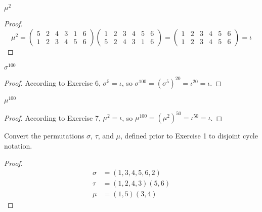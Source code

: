 \begin{exercise}
    $\mu^{2}$
\end{exercise}

\begin{proof}
    \[
        \mu^{2} =
        \begin{pmatrix}
            5 & 2 & 4 & 3 & 1 & 6 \\
            1 & 2 & 3 & 4 & 5 & 6
        \end{pmatrix}
        \begin{pmatrix}
            1 & 2 & 3 & 4 & 5 & 6 \\
            5 & 2 & 4 & 3 & 1 & 6
        \end{pmatrix} =
        \begin{pmatrix}
            1 & 2 & 3 & 4 & 5 & 6 \\
            1 & 2 & 3 & 4 & 5 & 6
        \end{pmatrix} =
        \iota
    \]
\end{proof}

\begin{exercise}
    $\sigma^{100}$
\end{exercise}

\begin{proof}
    According to Exercise 6, $\sigma^{5} = \iota$, so $\sigma^{100} = {(\sigma^{5})}^{20} = \iota^{20} = \iota$.
\end{proof}

\begin{exercise}
    $\mu^{100}$
\end{exercise}

\begin{proof}
    According to Exercise 7, $\mu^{2} = \iota$, so $\mu^{100} = {(\mu^{2})}^{50} = \iota^{50} = \iota$.
\end{proof}

\begin{exercise}
    Convert the permutations $\sigma$, $\tau$, and $\mu$, defined prior to Exercise 1 to disjoint cycle notation.
\end{exercise}

\begin{proof}
    \[
        \begin{split}
            \sigma & = (1, 3, 4, 5, 6, 2) \\
            \tau   & = (1, 2, 4, 3)(5, 6) \\
            \mu    & = (1, 5)(3, 4)
        \end{split}
    \]
\end{proof}

